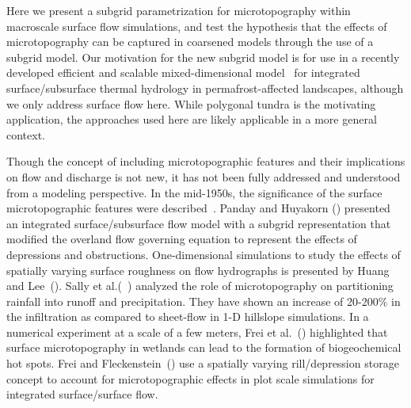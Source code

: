 Here we present a subgrid parametrization for microtopography within macroscale surface flow simulations, and test the hypothesis that the effects of microtopography can be captured in coarsened models through the use of a subgrid model.
Our motivation for the new subgrid model is for use in a recently developed efficient and scalable mixed-dimensional model~\citet{jan2017} for integrated  surface/subsurface thermal hydrology in permafrost-affected landscapes, although we only address surface flow here.  
While polygonal tundra is the motivating application, the approaches used here are likely applicable in a more general context. 
%

Though the concept of including microtopographic features and their implications on flow and discharge is not new, it has not been fully addressed and understood from a modeling perspective. 
In the mid-1950s, the significance of the surface microtopographic features were described~\citet{stammers1956effect}. 
Panday and Huyakorn () presented an integrated surface/subsurface flow model with a subgrid representation that modified the overland flow governing equation to represent the effects of depressions and obstructions. 
One-dimensional simulations to study the effects of spatially varying surface roughness on flow hydrographs is presented by Huang and Lee~(). Sally et al.(~) analyzed the role of microtopography on partitioning rainfall into runoff and precipitation. They have shown an increase of 20-200$\%$ in the infiltration as compared to sheet-flow in 1-D hillslope simulations. 
In a numerical experiment at a scale of a few meters, Frei et al.~() highlighted that surface microtopography in wetlands can lead to the formation of biogeochemical hot spots. 
Frei and Fleckenstein~() use a spatially varying rill/depression storage concept to account for microtopographic effects in plot scale simulations for integrated surface/surface flow. 
%

